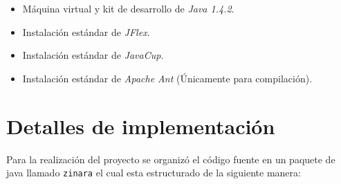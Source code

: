 \documentclass[12pt, spanish]{report}
\begin{document}
\begin{itemize}
\item M\'aquina virtual y kit de desarrollo de \emph{Java 1.4.2}.
\item Instalaci\'on est\'andar de \emph{JFlex}.
\item Instalaci\'on est\'andar de \emph{JavaCup}.
\item Instalaci\'on est\'andar de \emph{Apache Ant} (Únicamente para
  compilaci\'on).
\end{itemize}

\section{Detalles de implementaci\'on}
\label{sec:codigo}

Para la realizaci\'on del proyecto se organiz\'o el c\'odigo fuente en
un paquete de java llamado \texttt{zinara} el cual esta estructurado
de la siguiente manera:
\end{document}
